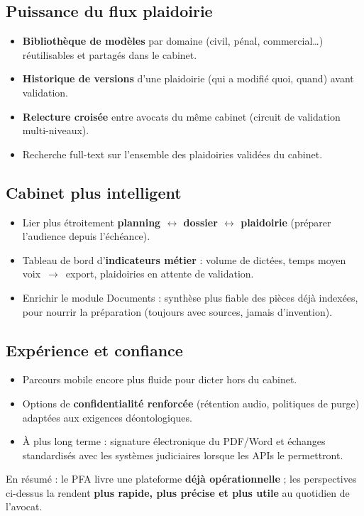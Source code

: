\subsection{Puissance du flux plaidoirie}
\begin{itemize}[leftmargin=1.4em]
  \item \textbf{Bibliothèque de modèles} par domaine (civil, pénal, commercial\ldots) réutilisables et partagés dans le cabinet.
  \item \textbf{Historique de versions} d'une plaidoirie (qui a modifié quoi, quand) avant validation.
  \item \textbf{Relecture croisée} entre avocats du même cabinet (circuit de validation multi-niveaux).
  \item Recherche full-text sur l'ensemble des plaidoiries validées du cabinet.
\end{itemize}

\subsection{Cabinet plus intelligent}
\begin{itemize}[leftmargin=1.4em]
  \item Lier plus étroitement \textbf{planning $\leftrightarrow$ dossier $\leftrightarrow$ plaidoirie} (préparer l'audience depuis l'échéance).
  \item Tableau de bord d'\textbf{indicateurs métier} : volume de dictées, temps moyen voix~$\rightarrow$~export, plaidoiries en attente de validation.
  \item Enrichir le module Documents : synthèse plus fiable des pièces déjà indexées, pour nourrir la préparation (toujours avec sources, jamais d'invention).
\end{itemize}

\subsection{Expérience et confiance}
\begin{itemize}[leftmargin=1.4em]
  \item Parcours mobile encore plus fluide pour dicter hors du cabinet.
  \item Options de \textbf{confidentialité renforcée} (rétention audio, politiques de purge) adaptées aux exigences déontologiques.
  \item À plus long terme : signature électronique du PDF/Word et échanges standardisés avec les systèmes judiciaires lorsque les APIs le permettront.
\end{itemize}

En résumé : le PFA livre une plateforme \textbf{déjà opérationnelle} ; les perspectives ci-dessus la rendent \textbf{plus rapide, plus précise et plus utile} au quotidien de l'avocat.
